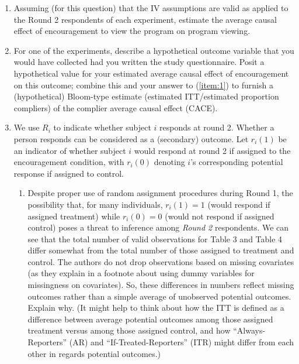 \documentclass{article}
\begin{document}
\begin{enumerate}
\item \label{item:1}Assuming (for this question) that the IV assumptions are
     valid as applied to the Round 2 respondents of each experiment, estimate
     the average causal effect of encouragement to view the program on
     program viewing.
\item For one of the experiments, describe a hypothetical outcome variable that
     you would have collected had you written the study questionnaire. Posit a
     hypothetical value for your estimated average causal effect of encouragement on this outcome;
     combine this and your answer to (\ref{item:1}) to furnish a (hypothetical)
     Bloom-type estimate (estimated ITT/estimated proportion compliers) of the
     complier average causal effect (CACE).

\item We use $R_i$ to indicate whether subject $i$ responds at round 2. Whether a
	person responds can be considered as a (secondary) outcome. Let
	$r_i(1)$ be an indicator of whether subject $i$ would respond at round
	2 if assigned to the encouragement condition, with $r_i(0)$ denoting
	$i$'s corresponding potential response if assigned to control.

     \begin{enumerate}

  \item Despite proper use of random assignment procedures during Round 1, the
       possibility that, for many individuals, $r_i(1)=1$ (would respond if
               assigned treatment) while $r_i(0)=0$ (would not respond if
               assigned control) poses a threat to inference among
               \textit{Round 2} respondents. We can see that the total number
               of valid observations for Table 3 and Table 4 differ somewhat
               from the total number of those assigned to treatment and
               control. The authors do not drop observations based on missing
               covariates (as they explain in a footnote about using dummy
               variables for missingness on covariates). So, these differences
               in numbers reflect missing outcomes rather than a simple average
               of unobserved potential outcomes. Explain why. (It might help to
               think about how the ITT is defined as a difference between
               average potential outcomes among those assigned treatment versus
               among those assigned control, and how ``Always-Reporters'' (AR) and
               ``If-Treated-Reporters'' (ITR) might differ from each other in regards
               potential outcomes.)


\end{enumerate}
\end{enumerate}
\end{document}
